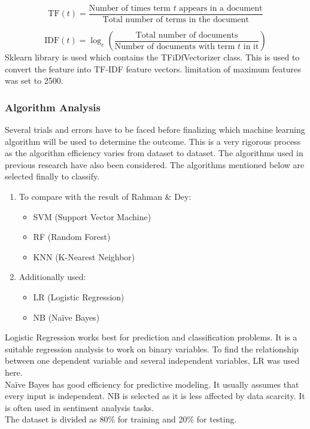 \documentclass[a4paper,12pt]{article}
\begin{document}
\begin{equation}
\text{TF}(t) = \frac{\text{Number of times term } t \text{ appears in a document}}{\text{Total number of terms in the document}}
\end{equation}

\begin{equation}
\text{IDF}(t) = \log_e \left( \frac{\text{Total number of documents}}{\text{Number of documents with term } t \text{ in it}} \right)
\end{equation}
Sklearn library\cite{pedregosa2011scikit} is used which contains the TFiDfVectorizer class. This is used to convert the feature into TF-IDF feature vectors. limitation of maximum features was set to 2500.
\vspace{0.5cm}
\subsubsection{Algorithm Analysis}
Several trials and errors have to be faced before finalizing which machine learning algorithm will be used to determine the outcome. This is a very rigorous process as the algorithm efficiency varies from dataset to dataset. The algorithms used in previous research have also been considered. The algorithms mentioned below are selected finally to classify.

\begin{enumerate}  
    \item To compare with the result of Rahman \& Dey\cite{rahman2018datasets}:
    \begin{itemize}
        \item SVM (Support Vector Machine)
        \item RF (Random Forest)
        \item KNN (K-Nearest Neighbor)
    \end{itemize}
    \item Additionally used:
    \begin{itemize}
        \item LR (Logistic Regression) \cite{LR}
        \item NB (Naïve Bayes)
    \end{itemize}
\end{enumerate}
\vspace{0.5cm}
Logistic Regression works best for prediction and classification problems. It is a suitable regression analysis to work on binary variables. To find the relationship between one dependent variable and several independent variables, LR was used here.\\
Naïve Bayes has good efficiency for predictive modeling. It usually assumes that every input is independent. NB is selected as it is less affected by data scarcity. It is often used in sentiment analysis tasks.\\
The dataset is divided as 80\% for training and 20\% for testing.
\end{document}
